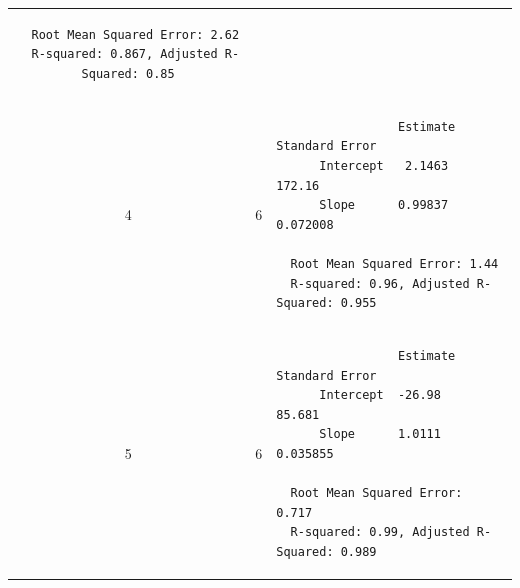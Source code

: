 \documentclass[%
  class = book,%
  crop = false,%
  float = true,%
  multi = true,%
  preview = false,%
]{standalone}
\begin{document}
\begin{table}
\begin{tabular}{ccl}
\begin{minipage}{4.5in}
\begin{verbatim}
  Root Mean Squared Error: 2.62
  R-squared: 0.867, Adjusted R-Squared: 0.85
\end{verbatim}
            \end{minipage} \\
    4 & 6 &
            \begin{minipage}{4.5in}
\begin{verbatim}
                 Estimate   Standard Error
      Intercept   2.1463        172.16
      Slope      0.99837      0.072008

  Root Mean Squared Error: 1.44
  R-squared: 0.96, Adjusted R-Squared: 0.955
\end{verbatim}
            \end{minipage} \\
    5 & 6 &
            \begin{minipage}{4.5in}
\begin{verbatim}
                 Estimate   Standard Error
      Intercept  -26.98        85.681
      Slope      1.0111      0.035855

  Root Mean Squared Error: 0.717
  R-squared: 0.99, Adjusted R-Squared: 0.989
\end{verbatim}
            \end{minipage} \\
    \bottomrule
  \end{tabular}
\end{table}
\end{document}
